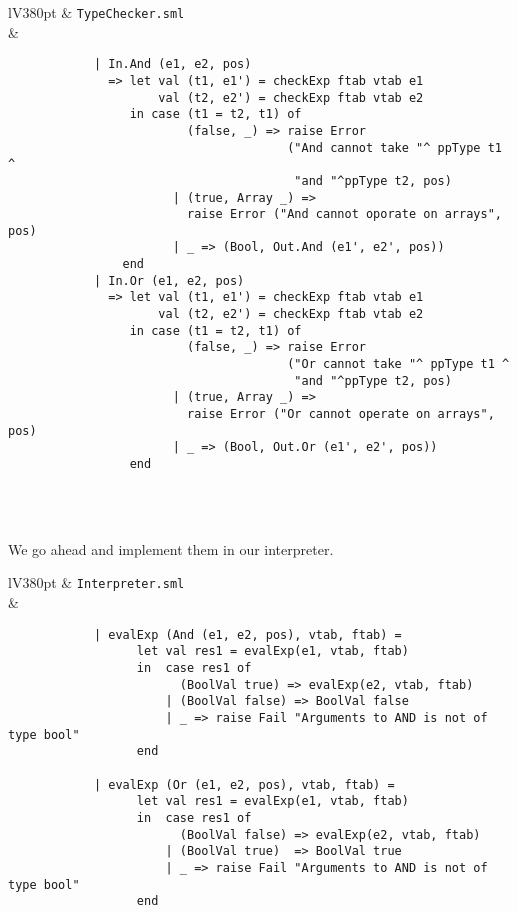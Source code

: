 \documentclass[a4paper]{article}
\begin{document}
\begin{center}	
	\begin{tabular}{lV{380pt}}
		\toprule
		& \verb|TypeChecker.sml|\\
		\midrule
		&
		\begin{verbatim}
			| In.And (e1, e2, pos)
			  => let val (t1, e1') = checkExp ftab vtab e1
			         val (t2, e2') = checkExp ftab vtab e2
			     in case (t1 = t2, t1) of
			             (false, _) => raise Error
			                           ("And cannot take "^ ppType t1 ^
			                            "and "^ppType t2, pos)
			           | (true, Array _) => 
			             raise Error ("And cannot oporate on arrays", pos)
			           | _ => (Bool, Out.And (e1', e2', pos))
			    end
			| In.Or (e1, e2, pos)
			  => let val (t1, e1') = checkExp ftab vtab e1
			         val (t2, e2') = checkExp ftab vtab e2
			     in case (t1 = t2, t1) of
			             (false, _) => raise Error 
			                           ("Or cannot take "^ ppType t1 ^
			                            "and "^ppType t2, pos)
			           | (true, Array _) => 
			             raise Error ("Or cannot operate on arrays", pos)
			           | _ => (Bool, Out.Or (e1', e2', pos))
			     end
		\end{verbatim}
		\\
		\bottomrule \\
	\end{tabular}
\end{center}

We go ahead and implement them in our interpreter.

\begin{center}	
	\begin{tabular}{lV{380pt}}
		\toprule
		& \verb|Interpreter.sml|\\
		\midrule
		&
		\begin{verbatim}
			| evalExp (And (e1, e2, pos), vtab, ftab) =
			      let val res1 = evalExp(e1, vtab, ftab)
			      in  case res1 of
			            (BoolVal true) => evalExp(e2, vtab, ftab)
			          | (BoolVal false) => BoolVal false
			          | _ => raise Fail "Arguments to AND is not of type bool"
			      end
			  
			| evalExp (Or (e1, e2, pos), vtab, ftab) =
			      let val res1 = evalExp(e1, vtab, ftab)
			      in  case res1 of
			            (BoolVal false) => evalExp(e2, vtab, ftab)
			          | (BoolVal true)  => BoolVal true
			          | _ => raise Fail "Arguments to AND is not of type bool"
			      end
		\end{verbatim}
		\\
		\bottomrule \\
	\end{tabular}
\end{center}
\end{document}
